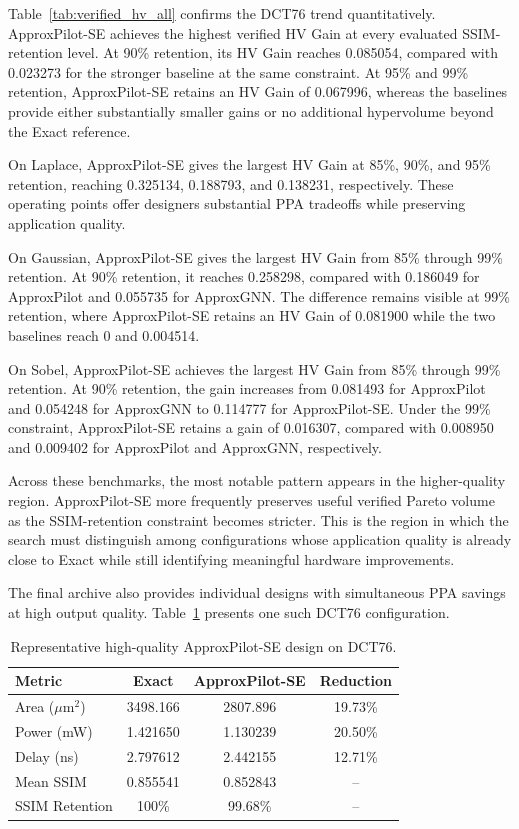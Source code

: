 Table~\ref{tab:verified_hv_all} confirms the DCT76 trend
quantitatively. ApproxPilot-SE achieves the highest verified
HV Gain at every evaluated SSIM-retention level. At 90\%
retention, its HV Gain reaches 0.085054, compared with
0.023273 for the stronger baseline at the same constraint.
At 95\% and 99\% retention, ApproxPilot-SE retains an
HV Gain of 0.067996, whereas the baselines provide either
substantially smaller gains or no additional hypervolume beyond
the Exact reference.

On Laplace, ApproxPilot-SE gives the largest HV Gain at
85\%, 90\%, and 95\% retention, reaching 0.325134,
0.188793, and 0.138231, respectively. These operating points
offer designers substantial PPA tradeoffs while preserving
application quality.

On Gaussian, ApproxPilot-SE gives the largest HV Gain from
85\% through 99\% retention. At 90\% retention, it reaches
0.258298, compared with 0.186049 for ApproxPilot and
0.055735 for ApproxGNN. The difference remains visible at
99\% retention, where ApproxPilot-SE retains an HV Gain of
0.081900 while the two baselines reach 0 and 0.004514.

On Sobel, ApproxPilot-SE achieves the largest HV Gain from
85\% through 99\% retention. At 90\% retention, the gain increases
from 0.081493 for ApproxPilot and 0.054248 for ApproxGNN
to 0.114777 for ApproxPilot-SE. Under the 99\% constraint,
ApproxPilot-SE retains a gain of 0.016307, compared with
0.008950 and 0.009402 for ApproxPilot and ApproxGNN,
respectively.

Across these benchmarks, the most notable pattern appears in
the higher-quality region. ApproxPilot-SE more frequently
preserves useful verified Pareto volume as the SSIM-retention
constraint becomes stricter. This is the region in which the
search must distinguish among configurations whose application
quality is already close to Exact while still identifying
meaningful hardware improvements.

The final archive also provides individual designs with simultaneous
PPA savings at high output quality. Table~\ref{tab:dct_case} presents
one such DCT76 configuration.

\begin{table}[!t]
\centering
\caption{Representative high-quality ApproxPilot-SE design on DCT76.}
\label{tab:dct_case}
\footnotesize
\setlength{\tabcolsep}{4.2pt}
\renewcommand{\arraystretch}{1.08}
\begin{tabular*}{\columnwidth}{@{\extracolsep{\fill}} lccc @{}}
\toprule
\textbf{Metric} &
\textbf{Exact} &
\textbf{ApproxPilot-SE} &
\textbf{Reduction} \\
\midrule
Area ($\mu$m$^2$)
& 3498.166
& 2807.896
& 19.73\% \\
Power (mW)
& 1.421650
& 1.130239
& 20.50\% \\
Delay (ns)
& 2.797612
& 2.442155
& 12.71\% \\
Mean SSIM
& 0.855541
& 0.852843
& -- \\
SSIM Retention
& 100\%
& 99.68\%
& -- \\
\bottomrule
\end{tabular*}
\end{table}

